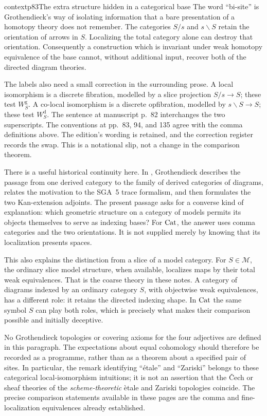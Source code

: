 \begin{dcomment}{context}{p83}{The extra structure hidden in a categorical base}
The word ``bi-site'' is Grothendieck's way of isolating information that a bare presentation of a homotopy theory does not remember. The categories $S/s$ and $s\backslash S$ retain the orientation of arrows in $S$. Localizing the total category alone can destroy that orientation. Consequently a construction which is invariant under weak homotopy equivalence of the base cannot, without additional input, recover both of the directed diagram theories.


The labels also need a small correction in the surrounding prose. A local
isomorphism is a discrete fibration, modelled by a slice projection $S/s\to S$;
these test $W_S^{\mathrm g}$. A co-local isomorphism is a discrete opfibration,
modelled by $s\backslash S\to S$; these test $W_S^{\mathrm d}$. The sentence at
manuscript p.~82 interchanges the two superscripts. The conventions at pp.~83,
94, and 135 agree with the comma definitions above. The edition's wording is
retained, and the correction register records the swap. This is a notational
slip, not a change in the comparison theorem.

There is a useful historical continuity here. In \citet[\S69, pp.~1--3 of the edited extract]{Grothendieck1983}, Grothendieck describes the passage from one derived category to the family of derived categories of diagrams, relates the motivation to the SGA~5 trace formalism, and then formulates the two Kan-extension adjoints. The present passage asks for a converse kind of explanation: which geometric structure on a category of models permits its objects themselves to serve as indexing bases? For $\mathrm{Cat}$, the answer uses comma categories and the two orientations. It is not supplied merely by knowing that its localization presents spaces.

This also explains the distinction from a slice of a model category. For $S\in\mathcal M$, the ordinary slice model structure, when available, localizes maps by their total weak equivalences. That is the coarse theory in these notes. A category of diagrams indexed by an ordinary category $S$, with objectwise weak equivalences, has a different role: it retains the directed indexing shape. In $\mathrm{Cat}$ the same symbol $S$ can play both roles, which is precisely what makes their comparison possible and initially deceptive.

No Grothendieck topologies or covering axioms for the four adjectives are defined in this paragraph. The expectations about equal cohomology should therefore be recorded as a programme, rather than as a theorem about a specified pair of sites. In particular, the remark identifying ``\'etale'' and ``Zariski'' belongs to these categorical local-isomorphism intuitions; it is not an assertion that the \v{C}ech or sheaf theories of the \emph{scheme-theoretic} \`etale and Zariski topologies coincide. The precise comparison statements available in these pages are the comma and fine-localization equivalences already established.
\end{dcomment}


